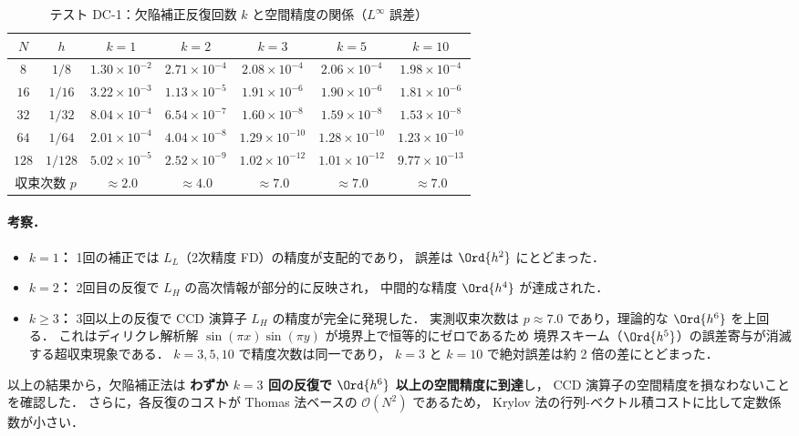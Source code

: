 \begin{table}[htbp]
\centering
\small
\caption{テスト DC-1：欠陥補正反復回数 $k$ と空間精度の関係（$L^\infty$ 誤差）}
\label{tab:dc_iteration_accuracy_legacy}%
\renewcommand{\arraystretch}{1.3}
\begin{tabular}{ccccccc}
\toprule
$N$ & $h$ & $k=1$ & $k=2$ & $k=3$ & $k=5$ & $k=10$ \\
\midrule
$8$   & $1/8$   & $1.30 \times 10^{-2}$ & $2.71 \times 10^{-4}$ & $2.08 \times 10^{-4}$ & $2.06 \times 10^{-4}$ & $1.98 \times 10^{-4}$ \\
$16$  & $1/16$  & $3.22 \times 10^{-3}$ & $1.13 \times 10^{-5}$ & $1.91 \times 10^{-6}$ & $1.90 \times 10^{-6}$ & $1.81 \times 10^{-6}$ \\
$32$  & $1/32$  & $8.04 \times 10^{-4}$ & $6.54 \times 10^{-7}$ & $1.60 \times 10^{-8}$ & $1.59 \times 10^{-8}$ & $1.53 \times 10^{-8}$ \\
$64$  & $1/64$  & $2.01 \times 10^{-4}$ & $4.04 \times 10^{-8}$ & $1.29 \times 10^{-10}$ & $1.28 \times 10^{-10}$ & $1.23 \times 10^{-10}$ \\
$128$ & $1/128$ & $5.02 \times 10^{-5}$ & $2.52 \times 10^{-9}$ & $1.02 \times 10^{-12}$ & $1.01 \times 10^{-12}$ & $9.77 \times 10^{-13}$ \\
\midrule
\multicolumn{2}{c}{収束次数 $p$} & $\approx 2.0$ & $\approx 4.0$ & $\approx 7.0$ & $\approx 7.0$ & $\approx 7.0$ \\
\bottomrule
\end{tabular}
\end{table}

\paragraph{考察．}

\begin{itemize}
  \item \textbf{$k=1$：} 1回の補正では $L_L$（2次精度 FD）の精度が支配的であり，
        誤差は $\Ord{h^2}$ にとどまった．
  \item \textbf{$k=2$：} 2回目の反復で $L_H$ の高次情報が部分的に反映され，
        中間的な精度 $\Ord{h^4}$ が達成された．
  \item \textbf{$k \geq 3$：} 3回以上の反復で CCD 演算子 $L_H$ の精度が完全に発現した．
        実測収束次数は $p \approx 7.0$ であり，理論的な $\Ord{h^6}$ を上回る．
        これはディリクレ解析解 $\sin(\pi x)\sin(\pi y)$ が境界上で恒等的にゼロであるため
        境界スキーム（$\Ord{h^5}$）の誤差寄与が消滅する超収束現象である．
        $k=3, 5, 10$ で精度次数は同一であり，
        $k=3$ と $k=10$ で絶対誤差は約 2 倍の差にとどまった．
\end{itemize}

以上の結果から，欠陥補正法は \textbf{わずか $k=3$ 回の反復で $\Ord{h^6}$ 以上の空間精度に到達}し，
CCD 演算子の空間精度を損なわないことを確認した．
さらに，各反復のコストが Thomas 法ベースの $\mathcal{O}(N^2)$ であるため，
Krylov 法の行列-ベクトル積コストに比して定数係数が小さい．
